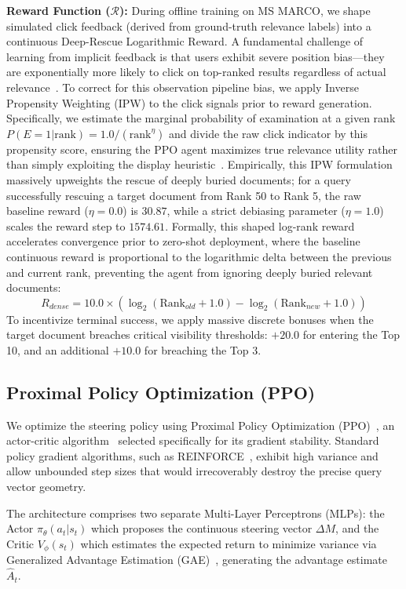 \textbf{Reward Function ($\mathcal{R}$):} During offline training on MS MARCO, we shape simulated click feedback (derived from ground-truth relevance labels) into a continuous Deep-Rescue Logarithmic Reward. A fundamental challenge of learning from implicit feedback is that users exhibit severe position bias—they are exponentially more likely to click on top-ranked results regardless of actual relevance~\citep{joachims2002}. To correct for this observation pipeline bias, we apply Inverse Propensity Weighting (IPW) to the click signals prior to reward generation. Specifically, we estimate the marginal probability of examination at a given rank $P(E=1 | \text{rank}) = 1.0 / (\text{rank}^\eta)$ and divide the raw click indicator by this propensity score, ensuring the PPO agent maximizes true relevance utility rather than simply exploiting the display heuristic~\citep{wang2016}. Empirically, this IPW formulation massively upweights the rescue of deeply buried documents; for a query successfully rescuing a target document from Rank 50 to Rank 5, the raw baseline reward ($\eta=0.0$) is $30.87$, while a strict debiasing parameter ($\eta=1.0$) scales the reward step to $1574.61$. Formally, this shaped log-rank reward accelerates convergence prior to zero-shot deployment, where the baseline continuous reward is proportional to the logarithmic delta between the previous and current rank, preventing the agent from ignoring deeply buried relevant documents:
\begin{equation}
R_{dense} = 10.0 \times (\log_2(\text{Rank}_{old} + 1.0) - \log_2(\text{Rank}_{new} + 1.0))
\end{equation}
To incentivize terminal success, we apply massive discrete bonuses when the target document breaches critical visibility thresholds: $+20.0$ for entering the Top 10, and an additional $+10.0$ for breaching the Top 3.

\subsection{Proximal Policy Optimization (PPO)}
We optimize the steering policy using Proximal Policy Optimization (PPO)~\citep{schulman2017}, an actor-critic algorithm~\citep{konda1999} selected specifically for its gradient stability. Standard policy gradient algorithms, such as REINFORCE~\citep{williams1992}, exhibit high variance and allow unbounded step sizes that would irrecoverably destroy the precise query vector geometry.

The architecture comprises two separate Multi-Layer Perceptrons (MLPs): the Actor $\pi_\theta(a_t|s_t)$ which proposes the continuous steering vector $\Delta M$, and the Critic $V_\phi(s_t)$ which estimates the expected return to minimize variance via Generalized Advantage Estimation (GAE)~\citep{schulman2016}, generating the advantage estimate $\hat{A}_t$.


